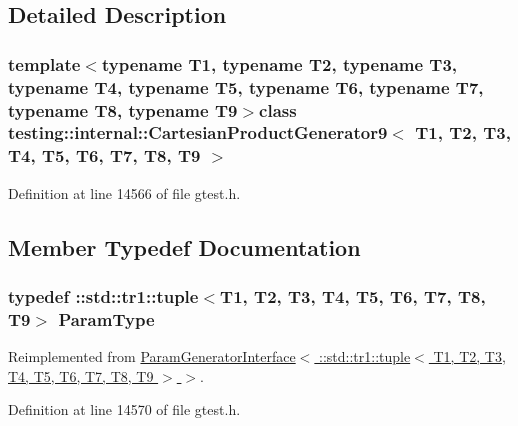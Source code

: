 \subsection{\-Detailed \-Description}
\subsubsection*{template$<$typename T1, typename T2, typename T3, typename T4, typename T5, typename T6, typename T7, typename T8, typename T9$>$class testing\-::internal\-::\-Cartesian\-Product\-Generator9$<$ T1, T2, T3, T4, T5, T6, T7, T8, T9 $>$}



\-Definition at line 14566 of file gtest.\-h.



\subsection{\-Member \-Typedef \-Documentation}
\hypertarget{classtesting_1_1internal_1_1CartesianProductGenerator9_a311b2d1d5a489d4841f258a70f33bf9d}{
\subsubsection[{\-Param\-Type}]{\setlength{\rightskip}{0pt plus 5cm}typedef \-::{\bf std\-::tr1\-::tuple}$<$\-T1, \-T2, \-T3, \-T4, \-T5, \-T6, \-T7, \-T8, \-T9$>$ {\bf \-Param\-Type}}}\label{de/ddb/classtesting_1_1internal_1_1CartesianProductGenerator9_a311b2d1d5a489d4841f258a70f33bf9d}


\-Reimplemented from \hyperlink{classtesting_1_1internal_1_1ParamGeneratorInterface_a1c17d95e5946c3f940ece2bd9165fc34}{\-Param\-Generator\-Interface$<$ \-::std\-::tr1\-::tuple$<$ T1, T2, T3, T4, T5, T6, T7, T8, T9 $>$ $>$}.



\-Definition at line 14570 of file gtest.\-h.



